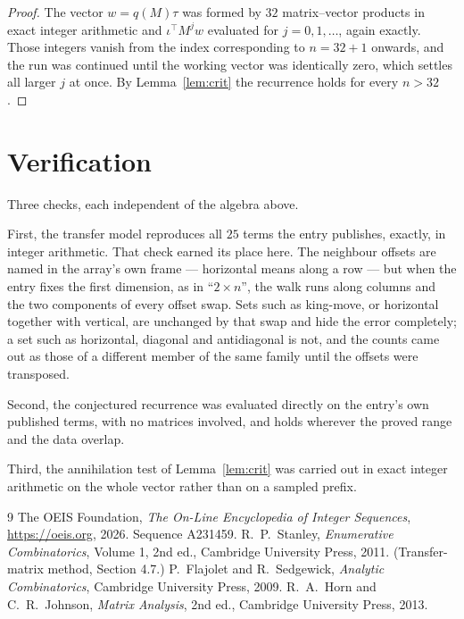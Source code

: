 \documentclass[11pt,a4paper]{article}
\theoremstyle{plain}
\theoremstyle{definition}
\begin{document}
\begin{proof}
The vector $w=q(M)\tau$ was formed by $32$ matrix--vector products in exact integer
arithmetic and $\iota^{\!\top}M^{j}w$ evaluated for $j=0,1,\dots$, again exactly. Those
integers vanish from the index corresponding to $n=32+1$ onwards, and the run was
continued until the working vector was identically zero, which settles all larger $j$ at once.
By Lemma~\ref{lem:crit} the recurrence holds for every $n>32$.
\end{proof}

\section{Verification}

Three checks, each independent of the algebra above.

First, the transfer model reproduces all $25$ terms the entry publishes, exactly, in
integer arithmetic. That check earned its place here. The neighbour offsets are named in the
array's own frame --- horizontal means along a row --- but when the entry fixes the first
dimension, as in ``$2\times n$'', the walk runs along columns and the two components of every
offset swap. Sets such as king-move, or horizontal together with vertical, are unchanged by
that swap and hide the error completely; a set such as horizontal, diagonal and antidiagonal
is not, and the counts came out as those of a different member of the same family until the
offsets were transposed.

Second, the conjectured recurrence was evaluated directly on the entry's own published terms,
with no matrices involved, and holds wherever the proved range and the data overlap.

Third, the annihilation test of Lemma~\ref{lem:crit} was carried out in exact integer
arithmetic on the whole vector rather than on a sampled prefix.

\begin{thebibliography}{9}
 The OEIS Foundation, \emph{The On-Line Encyclopedia of Integer
Sequences}, \url{https://oeis.org}, 2026. Sequence A231459.
 R.~P.~Stanley, \emph{Enumerative Combinatorics}, Volume 1, 2nd ed.,
Cambridge University Press, 2011. (Transfer-matrix method, Section 4.7.)
 P.~Flajolet and R.~Sedgewick, \emph{Analytic Combinatorics}, Cambridge
University Press, 2009.
 R.~A.~Horn and C.~R.~Johnson, \emph{Matrix Analysis}, 2nd ed., Cambridge
University Press, 2013.
\end{thebibliography}
\end{document}
